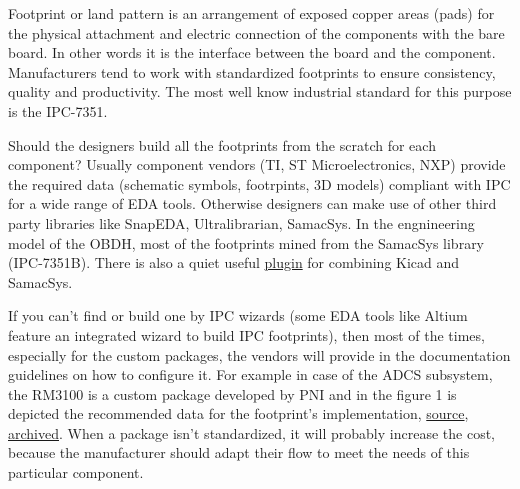 \documentclass[final]{cubedoc}
\begin{document}
	
	
	
	Footprint or land pattern is an arrangement of exposed copper areas (pads) for the physical attachment and electric connection of the components with the bare board. In other words it is the interface between the board and the component. Manufacturers tend to work with standardized footprints to ensure consistency, quality and productivity. The most well know industrial standard for this purpose is the IPC-7351. 
	
	Should the designers build all the footprints from the scratch for each component? Usually component vendors (TI, ST Microelectronics, NXP) provide the required data (schematic symbols, footrpints, 3D models) compliant with IPC for a wide range of EDA tools. Otherwise designers can make use of other third party libraries like SnapEDA, Ultralibrarian, SamacSys. In the engnineering model of the OBDH, most of the footprints mined from the SamacSys library (IPC-7351B). There is also a quiet useful \href{https://www.samacsys.com/kicad-libraries/}{plugin} for combining Kicad and SamacSys.
	
	If you can't find or build one by IPC wizards (some EDA tools like Altium feature an integrated wizard to build IPC footprints), then most of the times, especially for the custom packages, the vendors will provide in the documentation guidelines on how to configure it. For example in case of the ADCS subsystem, the RM3100 is a custom package developed by PNI and in the figure 1 is depicted the recommended data for the footprint's implementation, \href{https://www.pnicorp.com/wp-content/uploads/RM3100-Sensor-Suite-User-Manual-R07-1-2.pdf}{source}, \href{https://web.archive.org/web/20200812135747/https://www.pnicorp.com/wp-content/uploads/RM3100-Sensor-Suite-User-Manual-R07-1-2.pdf}{archived}. When a package isn't standardized, it will probably increase the cost, because the manufacturer should adapt their flow to meet the needs of this particular component. %
	
\end{document}

